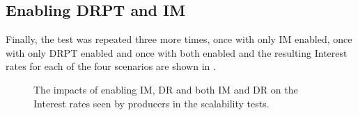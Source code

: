 





\subsection{Enabling DRPT and IM}
Finally, the test was repeated three more times, once with only IM enabled, once with only DRPT enabled and once with both enabled and the resulting Interest rates for each of the four scenarios are shown in .
\begin{figure}[H]
    \centering
    \caption{The impacts of enabling IM, DR and both IM and DR on the Interest rates seen by producers in the scalability tests.}
    \label{fig:eval:im-dr:impacts}
\end{figure}


